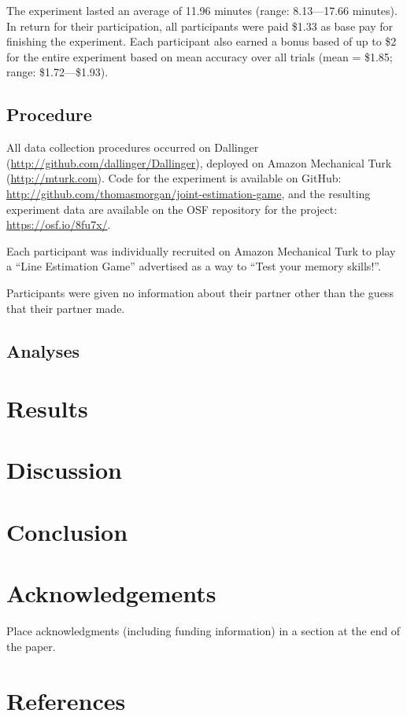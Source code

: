 \documentclass[10pt, letterpaper]{article}
\begin{document}
The experiment lasted an average of 11.96 minutes (range: 8.13---17.66
minutes). In return for their participation, all participants were paid
\$1.33 as base pay for finishing the experiment. Each participant also
earned a bonus based of up to \$2 for the entire experiment based on
mean accuracy over all trials (mean = \$1.85; range: \$1.72---\$1.93).

\subsection{Procedure}\label{procedure}

All data collection procedures occurred on Dallinger
(\url{http://github.com/dallinger/Dallinger}), deployed on Amazon
Mechanical Turk (\url{http://mturk.com}). Code for the experiment is
available on GitHub:
\url{http://github.com/thomasmorgan/joint-estimation-game}, and the
resulting experiment data are available on the OSF repository for the
project: \url{https://osf.io/8fu7x/}.

Each participant was individually recruited on Amazon Mechanical Turk to
play a ``Line Estimation Game'' advertised as a way to ``Test your
memory skills!''.

Participants were given no information about their partner other than
the guess that their partner made.

\subsection{Analyses}\label{analyses}

\section{Results}\label{results}

\section{Discussion}\label{discussion}

\section{Conclusion}\label{conclusion}

\section{Acknowledgements}\label{acknowledgements}

Place acknowledgments (including funding information) in a section at
the end of the paper.

\section{References}\label{references}

\setlength{\parindent}{-0.1in} \setlength{\leftskip}{0.125in} \noindent
\end{document}
